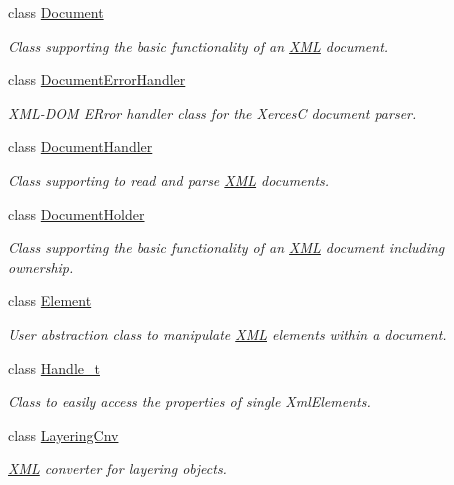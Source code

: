 \begin{DoxyCompactItemize}
class \hyperlink{class_d_d4hep_1_1_x_m_l_1_1_document}{Document}
\begin{DoxyCompactList}\small\item\em Class supporting the basic functionality of an \hyperlink{namespace_d_d4hep_1_1_x_m_l}{X\+ML} document. \end{DoxyCompactList}\item 
class \hyperlink{class_d_d4hep_1_1_x_m_l_1_1_document_error_handler}{Document\+Error\+Handler}
\begin{DoxyCompactList}\small\item\em X\+M\+L-\/\+D\+OM E\+Rror handler class for the XercesC document parser. \end{DoxyCompactList}\item 
class \hyperlink{class_d_d4hep_1_1_x_m_l_1_1_document_handler}{Document\+Handler}
\begin{DoxyCompactList}\small\item\em Class supporting to read and parse \hyperlink{namespace_d_d4hep_1_1_x_m_l}{X\+ML} documents. \end{DoxyCompactList}\item 
class \hyperlink{class_d_d4hep_1_1_x_m_l_1_1_document_holder}{Document\+Holder}
\begin{DoxyCompactList}\small\item\em Class supporting the basic functionality of an \hyperlink{namespace_d_d4hep_1_1_x_m_l}{X\+ML} document including ownership. \end{DoxyCompactList}\item 
class \hyperlink{class_d_d4hep_1_1_x_m_l_1_1_element}{Element}
\begin{DoxyCompactList}\small\item\em User abstraction class to manipulate \hyperlink{namespace_d_d4hep_1_1_x_m_l}{X\+ML} elements within a document. \end{DoxyCompactList}\item 
class \hyperlink{class_d_d4hep_1_1_x_m_l_1_1_handle__t}{Handle\+\_\+t}
\begin{DoxyCompactList}\small\item\em Class to easily access the properties of single Xml\+Elements. \end{DoxyCompactList}\item 
class \hyperlink{class_d_d4hep_1_1_x_m_l_1_1_layering_cnv}{Layering\+Cnv}
\begin{DoxyCompactList}\small\item\em \hyperlink{namespace_d_d4hep_1_1_x_m_l}{X\+ML} converter for layering objects. \end{DoxyCompactList}\item 

\end{DoxyCompactItemize}
